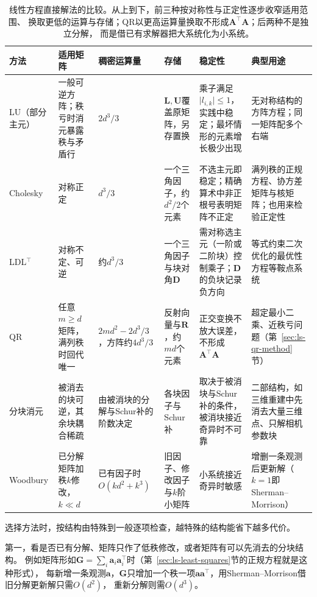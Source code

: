 \begin{table}[htbp]
 \centering\small
 \begin{tabularx}{\linewidth}{@{}l>{\raggedright\arraybackslash}X>{\raggedright\arraybackslash}p{24mm}>{\raggedright\arraybackslash}X>{\raggedright\arraybackslash}X>{\raggedright\arraybackslash}X@{}}
  \toprule
  方法 & 适用矩阵 & 稠密运算量 & 存储 & 稳定性 & 典型用途\\
  \midrule
  LU（部分主元） & 一般可逆方阵；秩亏时消元暴露秩与矛盾行 & $2d^3/3$ & $\bm L,\bm U$覆盖原矩阵，另存置换 & 乘子满足$\lvert l_{i,k}\rvert\leq1$，实践中稳定；最坏情形的元素增长极少出现 & 无对称结构的方阵方程；同一矩阵配多个右端\\
  Cholesky & 对称正定 & $d^3/3$ & 一个三角因子，约$d^2/2$个元素 & 不选主元即稳定；精确算术中非正根号表明矩阵不正定 & 满列秩的正规方程、协方差矩阵与核矩阵；也用来检验正定性\\
  LDL$^{\top}$ & 对称不定、可逆 & 约$d^3/3$ & 一个三角因子与块对角$\bm D$ & 需对称选主元（一阶或二阶块）控制乘子；$\bm D$的负块记录负方向 & 等式约束二次优化的最优性方程等鞍点系统\\
  QR & 任意$m\geq d$矩阵，满列秩时回代唯一 & $2md^2-2d^3/3$，方阵约$4d^3/3$ & 反射向量与$\bm R$，约$md$个元素 & 正交变换不放大误差，不形成$\bm A^\top\bm A$ & 超定最小二乘、近秩亏问题（第~\ref{sec:ls-qr-method}节）\\
  分块消元 & 被消去的块可逆，其余块耦合稀疏 & 由被消块的分解与Schur补的阶数决定 & 各块因子与Schur补 & 取决于被消块与Schur补的条件，被消块接近奇异时不可靠 & 二部结构，如三维重建中先消去大量三维点、只解相机参数块\\
  Woodbury & 已分解矩阵加秩$k$修改，$k\ll d$ & 已有因子时$O(kd^2+k^3)$ & 旧因子、修改因子与$k$阶小矩阵 & 小系统接近奇异时敏感 & 增删一条观测后更新解（$k=1$即Sherman--Morrison）\\
  \bottomrule
 \end{tabularx}
 \caption{线性方程直接解法的比较。从上到下，前三种按对称性与正定性逐步收窄适用范围、
 换取更低的运算与存储；QR以更高运算量换取不形成$\bm A^\top\bm A$；后两种不是独立分解，
 而是借已有求解器把大系统化为小系统。}
 \label{tab:ls-direct-method-comparison}
\end{table}

选择方法时，按结构由特殊到一般逐项检查，越特殊的结构能省下越多代价。

第一，看是否已有分解、矩阵只作了低秩修改，或者矩阵有可以先消去的分块结构。
例如矩阵形如$\bm G=\sum_i\bm a_i\bm a_i^\top$时（第~\ref{sec:ls-least-squares}节的正规方程就是这种形式），
每新增一条观测$\bm a$，$\bm G$只增加一个秩一项$\bm a\bm a^\top$，用Sherman--Morrison借旧分解更新解只需$O(d^2)$，
重新分解则需$O(d^3)$。

